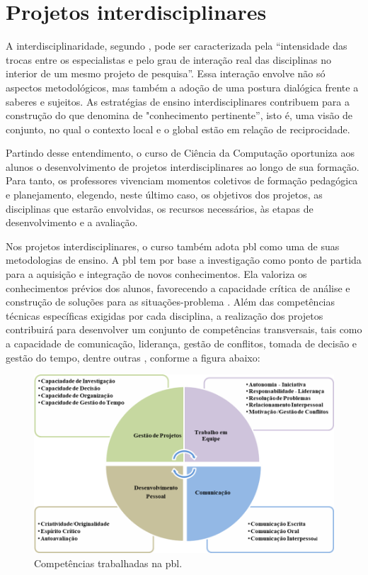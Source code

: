 \documentclass[
	12pt,				%
	openright,			%
  oneside,     %
	a4paper,			%
 hyphens,
	chapter=TITLE,		%
	english,			%
	french,				%
	spanish,			%
	brazil				%
	]{abntex2}
\begin{document}
\section{Projetos interdisciplinares}

A interdisciplinaridade, segundo , pode ser caracterizada pela “intensidade das trocas entre os especialistas e pelo grau de interação real das disciplinas no interior de um mesmo projeto de pesquisa”. Essa interação envolve não só aspectos metodológicos, mas também a adoção de uma postura dialógica frente a saberes e sujeitos. As estratégias de ensino interdisciplinares contribuem para a construção do que  denomina de "conhecimento pertinente”, isto é, uma visão de conjunto, no qual o contexto local e o global estão em relação de reciprocidade.
	
Partindo desse entendimento, o curso de Ciência da Computação oportuniza aos alunos o desenvolvimento de projetos interdisciplinares ao longo de sua formação. Para tanto, os professores vivenciam momentos coletivos de formação pedagógica e planejamento, elegendo, neste último caso, os objetivos dos projetos, as disciplinas que estarão envolvidas, os recursos necessários, às etapas de desenvolvimento e a avaliação.

Nos projetos interdisciplinares, o curso também adota \acrshort{pbl} como uma de suas metodologias de ensino. A \acrshort{pbl} tem por base a investigação como ponto de partida para a aquisição e integração de novos conhecimentos. Ela valoriza os conhecimentos prévios dos alunos, favorecendo a capacidade crítica de análise e construção de soluções para as situações-problema \cite{barrows1986taxonomy}. Além das competências técnicas específicas exigidas por cada disciplina, a realização dos projetos contribuirá para desenvolver um conjunto de competências transversais, tais como a capacidade de comunicação, liderança, gestão de conflitos, tomada de decisão e gestão do tempo, dentre outras \cite{cabral2006competencias}, conforme a figura abaixo:

\begin{figure}[!htb]
    \centering
    \caption{\label{fig:competencias-pbl}Competências trabalhadas na \acrshort{pbl}.}
    
    \includegraphics[width=\textwidth]{images/competencias_pbl.png}
  \end{figure}
\end{document}
